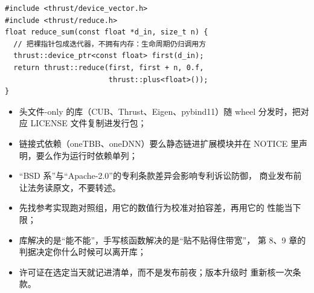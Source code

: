 \documentclass[12pt,a4paper,fontset=fandol]{ctexbook}
\begin{document}
\begin{lstlisting}[style=cudastyle,caption={用 Thrust 做归约对照组（第一版，后被手写核函数替换）},label={lst:cub-start}]
#include <thrust/device_vector.h>
#include <thrust/reduce.h>
float reduce_sum(const float *d_in, size_t n) {
  // 把裸指针包成迭代器，不拥有内存：生命周期仍归调用方
  thrust::device_ptr<const float> first(d_in);
  return thrust::reduce(first, first + n, 0.f,
                        thrust::plus<float>());
}
\end{lstlisting}

\begin{note}[title={许可与分发的三个动作}]
\begin{itemize}
\item 头文件-only 的库（CUB、Thrust、Eigen、pybind11）随 wheel
分发时，把对应 LICENSE 文件复制进发行包；
\item 链接式依赖（oneTBB、oneDNN）要么静态链进扩展模块并在 NOTICE
里声明，要么作为运行时依赖单列；
\item ``BSD 系''与``Apache-2.0''的专利条款差异会影响专利诉讼防御，
商业发布前让法务读原文，不要转述。
\end{itemize}
\end{note}

\begin{guideline}[title={选型次序}]
\begin{itemize}
\item 先找参考实现跑对照组，用它的数值行为校准对拍容差，再用它的
性能当下限；
\item 库解决的是``能不能''，手写核函数解决的是``贴不贴得住带宽''，
第 8、9 章的判据决定你什么时候可以离开库；
\item 许可证在选定当天就记进清单，而不是发布前夜；版本升级时
重新核一次条款。
\end{itemize}
\end{guideline}
\end{document}
